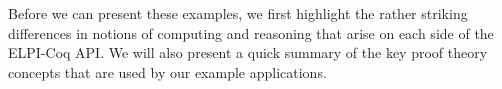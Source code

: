 Before we can present these examples, we first highlight the rather
striking differences in notions of computing and reasoning that arise
on each side of the ELPI-Coq API.   We will also present a quick
summary of the key proof theory concepts that are used by our example
applications.


